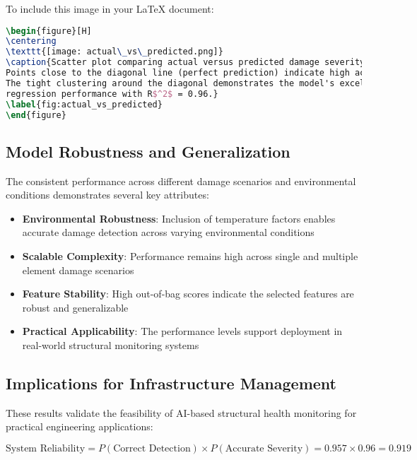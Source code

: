 \documentclass[11pt,a4paper]{article}
\begin{document}
To include this image in your LaTeX document:

\begin{lstlisting}[language=TeX]
\begin{figure}[H]
\centering
\texttt{[image: actual\_vs\_predicted.png]}
\caption{Scatter plot comparing actual versus predicted damage severity percentages. 
Points close to the diagonal line (perfect prediction) indicate high accuracy. 
The tight clustering around the diagonal demonstrates the model's excellent 
regression performance with R$^2$ = 0.96.}
\label{fig:actual_vs_predicted}
\end{figure}
\end{lstlisting}

\subsection{Model Robustness and Generalization}

The consistent performance across different damage scenarios and environmental conditions demonstrates several key attributes:

\begin{itemize}
    \item \textbf{Environmental Robustness}: Inclusion of temperature factors enables accurate damage detection across varying environmental conditions
    \item \textbf{Scalable Complexity}: Performance remains high across single and multiple element damage scenarios
    \item \textbf{Feature Stability}: High out-of-bag scores indicate the selected features are robust and generalizable
    \item \textbf{Practical Applicability}: The performance levels support deployment in real-world structural monitoring systems
\end{itemize}

\subsection{Implications for Infrastructure Management}

These results validate the feasibility of AI-based structural health monitoring for practical engineering applications:

\begin{equation}
\text{System Reliability} = P(\text{Correct Detection}) \times P(\text{Accurate Severity}) = 0.957 \times 0.96 = 0.919
\end{equation}
\end{document}
